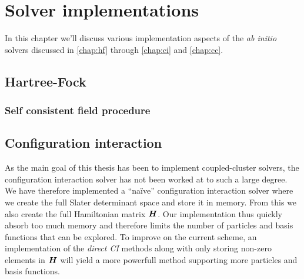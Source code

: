 \chapter{Solver implementations}
    In this chapter we'll discuss various implementation aspects of the \emph{ab
    initio} solvers discussed in \autoref{chap:hf} through \autoref{chap:ci} and
    \autoref{chap:cc}.

    \section{Hartree-Fock}
        \subsection{Self consistent field procedure}

    \section{Configuration interaction}
        As the main goal of this thesis has been to implement coupled-cluster
        solvers, the configuration interaction solver has not been worked at to
        such a large degree.
        We have therefore implemented a ``naïve'' configuration interaction
        solver where we create the full Slater determinant space and store it in
        memory.
        From this we also create the full Hamiltonian matrix $\boldsymbol{H}$.
        Our implementation thus quickly absorb too much memory and therefore
        limits the number of particles and basis functions that can be explored.
        To improve on the current scheme, an implementation of the \emph{direct
        CI} methods \cite{helgaker-molecular} along with only storing non-zero
        elements in $\boldsymbol{H}$ will yield a more powerfull method supporting
        more particles and basis functions.

